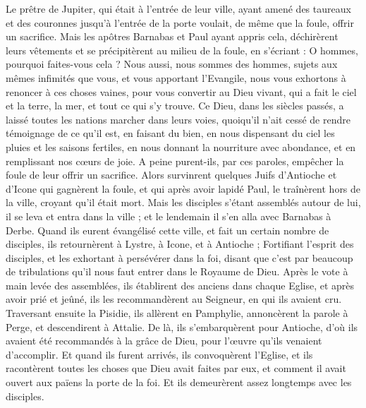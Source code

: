 \begin{multicols}{2}
Le prêtre de Jupiter, qui était à l’entrée de leur ville, ayant amené des taureaux et des couronnes jusqu'à l'entrée de la porte voulait, de même que la foule, offrir un sacrifice.
Mais les apôtres Barnabas et Paul ayant appris cela, déchirèrent leurs vêtements et se précipitèrent au milieu de la foule,
en s’écriant : O hommes, pourquoi faites-vous cela ? Nous aussi, nous sommes des hommes, sujets aux mêmes infimités que vous, et vous apportant l’Evangile, nous vous exhortons à renoncer à ces choses vaines, pour vous convertir au Dieu vivant, qui a fait le ciel et la terre, la mer, et tout ce qui s’y trouve.
Ce Dieu, dans les siècles passés, a laissé toutes les nations marcher dans leurs voies,
quoiqu'il n’ait cessé de rendre témoignage de ce qu’il est, en faisant du bien, en nous dispensant du ciel les pluies et les saisons fertiles, en nous donnant la nourriture avec abondance, et en remplissant nos cœurs de joie.
A peine purent-ils, par ces paroles, empêcher la foule de leur offrir un sacrifice.
Alors survinrent quelques Juifs d'Antioche et d'Icone qui gagnèrent la foule, et qui après avoir lapidé Paul, le traînèrent hors de la ville, croyant qu'il était mort.
Mais les disciples s'étant assemblés autour de lui, il se leva et entra dans la ville ; et le lendemain il s'en alla avec Barnabas à Derbe.
Quand ils eurent évangélisé cette ville, et fait un certain nombre de disciples, ils retournèrent à Lystre, à Icone, et à Antioche ;
Fortifiant l'esprit des disciples, et les exhortant à persévérer dans la foi, disant que c'est par beaucoup de tribulations qu'il nous faut entrer dans le Royaume de Dieu.
Après le vote à main levée des assemblées, ils établirent des anciens dans chaque Eglise, et après avoir prié et jeûné, ils les recommandèrent au Seigneur, en qui ils avaient cru.
Traversant ensuite la Pisidie, ils allèrent en Pamphylie,
annoncèrent la parole à Perge, et descendirent à Attalie.
De là, ils s’embarquèrent pour Antioche, d'où ils avaient été recommandés à la grâce de Dieu, pour l’œuvre qu'ils venaient d’accomplir.
Et quand ils furent arrivés, ils convoquèrent l’Eglise, et ils racontèrent toutes les choses que Dieu avait faites par eux, et comment il avait ouvert aux païens la porte de la foi.
Et ils demeurèrent assez longtemps avec les disciples.

\end{multicols}
